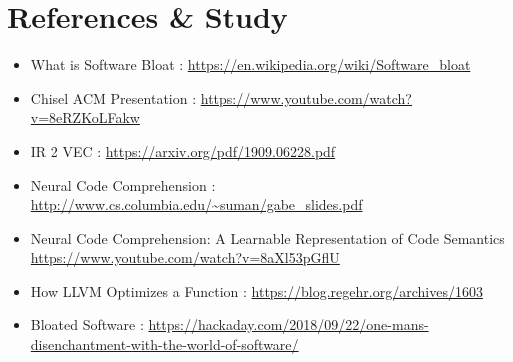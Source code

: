 \documentclass{article} %
\begin{document}
\section*{References \& Study}
\begin{itemize}
    \item What is Software Bloat : \url{https://en.wikipedia.org/wiki/Software_bloat}
    \item Chisel ACM Presentation : \url{https://www.youtube.com/watch?v=8eRZKoLFakw}
    \item IR 2 VEC : \url{https://arxiv.org/pdf/1909.06228.pdf}
    \item Neural Code Comprehension : \url{http://www.cs.columbia.edu/~suman/gabe_slides.pdf}
    \item Neural Code Comprehension: A Learnable Representation of Code Semantics \url{https://www.youtube.com/watch?v=8aXl53pGflU}
    \item How LLVM Optimizes a Function : \url{https://blog.regehr.org/archives/1603}
    \item Bloated Software : \url{https://hackaday.com/2018/09/22/one-mans-disenchantment-with-the-world-of-software/}
\end{itemize}
\end{document}
